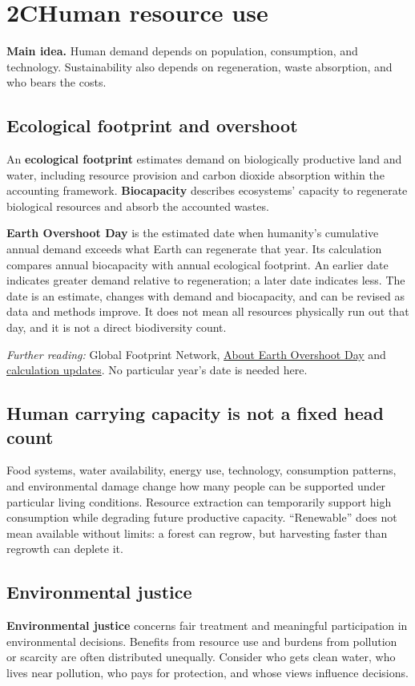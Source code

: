\documentclass[11pt,letterpaper]{article}
\newcommand{\pagechapter}[2]{\clearpage\section*{#1}\phantomsection\label{#2}\addcontentsline{toc}{section}{#1}}
\newcommand{\idea}[1]{\textbf{Main idea.} #1\par}
\newcommand{\source}[1]{{\footnotesize\textit{Further reading:} #1\par}}
\begin{document}
\pagechapter{2C\quad Human resource use}{humans}
\idea{Human demand depends on population, consumption, and technology. Sustainability also depends on regeneration, waste absorption, and who bears the costs.}
\subsection*{Ecological footprint and overshoot}
An \textbf{ecological footprint} estimates demand on biologically productive land and water, including resource provision and carbon dioxide absorption within the accounting framework. \textbf{Biocapacity} describes ecosystems' capacity to regenerate biological resources and absorb the accounted wastes.

\textbf{Earth Overshoot Day} is the estimated date when humanity's cumulative annual demand exceeds what Earth can regenerate that year. Its calculation compares annual biocapacity with annual ecological footprint. An earlier date indicates greater demand relative to regeneration; a later date indicates less. The date is an estimate, changes with demand and biocapacity, and can be revised as data and methods improve. It does not mean all resources physically run out that day, and it is not a direct biodiversity count.
\source{Global Footprint Network, \href{https://overshoot.footprintnetwork.org/about-earth-overshoot-day/}{About Earth Overshoot Day} and \href{https://footprintnetwork.org/our-work/earth-overshoot-day/}{calculation updates}. No particular year's date is needed here.}
\subsection*{Human carrying capacity is not a fixed head count}
Food systems, water availability, energy use, technology, consumption patterns, and environmental damage change how many people can be supported under particular living conditions. Resource extraction can temporarily support high consumption while degrading future productive capacity. ``Renewable'' does not mean available without limits: a forest can regrow, but harvesting faster than regrowth can deplete it.
\subsection*{Environmental justice}
\textbf{Environmental justice} concerns fair treatment and meaningful participation in environmental decisions. Benefits from resource use and burdens from pollution or scarcity are often distributed unequally. Consider who gets clean water, who lives near pollution, who pays for protection, and whose views influence decisions.
\end{document}
